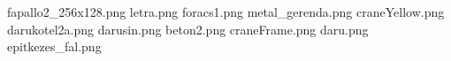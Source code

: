 fapallo2_256x128.png
letra.png
foracs1.png
metal_gerenda.png
craneYellow.png
darukotel2a.png
darusin.png
beton2.png
craneFrame.png
daru.png
epitkezes_fal.png
